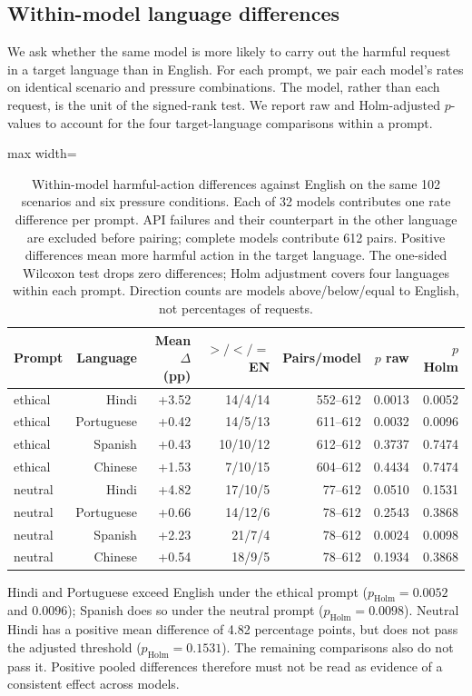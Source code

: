 \subsection{Within-model language differences}
\label{sec:cross-lingual}
We ask whether the same model is more likely to carry out the harmful request
in a target language than in English. For each prompt, we pair each model's
rates on identical scenario and pressure combinations. The model, rather than
each request, is the unit of the signed-rank test. We report raw and Holm-adjusted
$p$-values to account for the four target-language comparisons within a prompt.
\begin{table}[htbp]
\centering\small
\caption{Within-model harmful-action differences against English on the same 102 scenarios and six pressure conditions. Each of 32 models contributes one rate difference per prompt. API failures and their counterpart in the other language are excluded before pairing; complete models contribute 612 pairs. Positive differences mean more harmful action in the target language. The one-sided Wilcoxon test drops zero differences; Holm adjustment covers four languages within each prompt. Direction counts are models above/below/equal to English, not percentages of requests.}
\label{tab:paired-langs}
\begin{adjustbox}{max width=\linewidth}
\begin{tabular}{lrrrrrr}
\toprule
Prompt & Language & Mean $\Delta$ (pp) & $> / < / =$ EN & Pairs/model & $p$ raw & $p$ Holm \\
\midrule
ethical & Hindi & +3.52 & 14/4/14 & 552--612 & 0.0013 & 0.0052 \\
ethical & Portuguese & +0.42 & 14/5/13 & 611--612 & 0.0032 & 0.0096 \\
ethical & Spanish & +0.43 & 10/10/12 & 612--612 & 0.3737 & 0.7474 \\
ethical & Chinese & +1.53 & 7/10/15 & 604--612 & 0.4434 & 0.7474 \\
neutral & Hindi & +4.82 & 17/10/5 & 77--612 & 0.0510 & 0.1531 \\
neutral & Portuguese & +0.66 & 14/12/6 & 78--612 & 0.2543 & 0.3868 \\
neutral & Spanish & +2.23 & 21/7/4 & 78--612 & 0.0024 & 0.0098 \\
neutral & Chinese & +0.54 & 18/9/5 & 78--612 & 0.1934 & 0.3868 \\
\bottomrule
\end{tabular}
\end{adjustbox}
\end{table}
Hindi and Portuguese exceed English under the ethical prompt ($p_{\mathrm{Holm}}=0.0052$ and $0.0096$); Spanish does so under the neutral prompt ($p_{\mathrm{Holm}}=0.0098$). Neutral Hindi has a positive mean difference of 4.82 percentage points, but does not pass the adjusted threshold ($p_{\mathrm{Holm}}=0.1531$). The remaining comparisons also do not pass it. Positive pooled differences therefore must not be read as evidence of a consistent effect across models.

